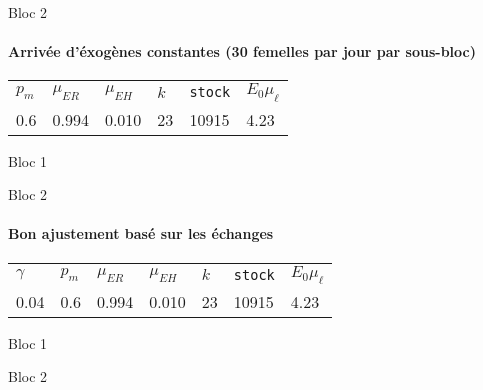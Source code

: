 \documentclass[a4paper, 11pt]{article}
\begin{document}
 Bloc 2
  \begin{figure}[ht]
 \centering
{}
\end{figure}
 
 
 \clearpage
 \paragraph{Arrivée d'éxogènes constantes (30 femelles par jour par sous-bloc)}
   \begin{center}
\begin{tabular}{llllll}
 $p_m$ & $\mu_{ER}$ & $\mu_{EH}$ & $k$ & \texttt{stock} & $E_0 \mu_{\ell}$\\
 0.6 & 0.994 & 0.010 & 23& 10915 & 4.23
 \end{tabular}
 \end{center}
 
 Bloc 1
  \begin{figure}[ht]
 \centering
{}
\end{figure}
 
 Bloc 2
  \begin{figure}[ht]
 \centering
{}
\end{figure}
 
 
\clearpage
 \paragraph{Bon ajustement basé sur les échanges}
   \begin{center}
\begin{tabular}{lllllll}
$\gamma$ & $p_m$ & $\mu_{ER}$ & $\mu_{EH}$ & $k$ & \texttt{stock} & $E_0 \mu_{\ell}$\\
0.04 & 0.6 & 0.994 & 0.010 & 23& 10915 & 4.23
 \end{tabular}
 \end{center}
 
 Bloc 1
  \begin{figure}[ht]
 \centering
{}
\end{figure}
 
 Bloc 2
  \begin{figure}[ht]
 \centering
{}
\end{figure}
 
\end{document}
